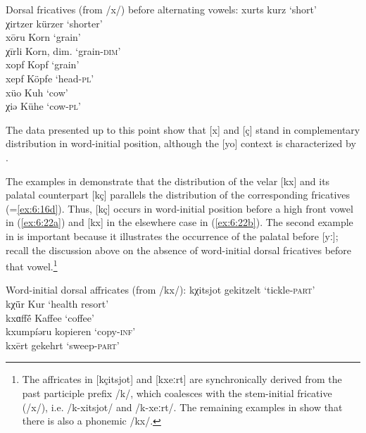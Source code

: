 \ea%
\label{ex:6:21}
Dorsal fricatives (from /x/) before alternating vowels:
\ea \label{ex:6:21a}
     xurts   \tab [xurts]   \tab kurz   \tab ‘short’    \\
     χirtzer \tab [çirtser] \tab kürzer \tab ‘shorter’  \\
\ex\label{ex:6:21b} xōru  \tab [xoːru]  \tab Korn       \tab ‘grain’                \\
    χīrli \tab [çiːrli] \tab Korn, dim. \tab ‘grain-\textsc{dim}’   \\
\ex\label{ex:6:21c} xopf  \tab [xopf]   \tab Kopf       \tab ‘grain’               \\
    xepf  \tab [xepf]   \tab Köpfe      \tab ‘head-\textsc{pl}’               \\
\ex\label{ex:6:21d} xüo   \tab [xyo]    \tab Kuh        \tab ‘cow’                 \\
    χiə   \tab [çiæ]    \tab Kühe       \tab ‘cow-\textsc{pl}’                \\
\z
\z 

The data presented up to this point show that [x] and [ç] stand in complementary distribution in word-initial position, although the [yo] context is characterized by .

The examples in  demonstrate that the distribution of the velar  [kx] and its palatal counterpart [kç] parallels the distribution of the corresponding fricatives (=\ref{ex:6:16d}). Thus, [kç] occurs in word-initial position before a high front vowel in (\ref{ex:6:22a}) and [kx] in the elsewhere case in (\ref{ex:6:22b}). The second example in  is important because it illustrates the occurrence of the palatal  before [yː]; recall the discussion above on the absence of word-initial dorsal fricatives before that vowel.\footnote{{The affricates in [kçitsjot] and [kxeːrt] are synchronically derived from the past participle prefix /k/, which coalesces with the stem-initial fricative (/x/), i.e. /k-xitsjot/ and /k-xeːrt/.  The remaining examples in  show that there is also a phonemic  /kx/.}}\largerpage[-1]\pagebreak

\ea%
Word-initial dorsal affricates (from /kx/):\label{ex:6:22}
\ea\label{ex:6:22a}    kχitsjot  \tab [kçitsjot]   \tab gekitzelt \tab ‘tickle-\textsc{part}’ \\
       kχǖr      \tab [kçyːr]      \tab Kur       \tab ‘health resort’         \\
\ex\label{ex:6:22b}    kxɑffḗ    \tab  [kxɑffeː]   \tab Kaffee    \tab ‘coffee’                \\
       kxumpíəru \tab  [kxumpiæru] \tab kopieren  \tab ‘copy-\textsc{inf}’     \\
       kxērt     \tab  [kxeːrt]    \tab gekehrt   \tab ‘sweep-\textsc{part}’   \\
    \z
\z 

